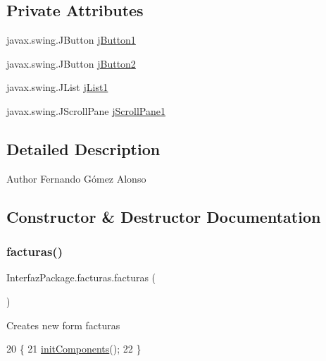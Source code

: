 \subsection*{Private Attributes}
\begin{DoxyCompactItemize}
\item 
javax.\+swing.\+J\+Button \mbox{\hyperlink{class_interfaz_package_1_1facturas_adb32118a114d1f85a76fafb76589f8c6}{j\+Button1}}
\item 
javax.\+swing.\+J\+Button \mbox{\hyperlink{class_interfaz_package_1_1facturas_acf837914fb3ffc261c9cdb1174c6d9bc}{j\+Button2}}
\item 
javax.\+swing.\+J\+List \mbox{\hyperlink{class_interfaz_package_1_1facturas_adbdef786d8dff4c1b59ff2a1308ed6c5}{j\+List1}}
\item 
javax.\+swing.\+J\+Scroll\+Pane \mbox{\hyperlink{class_interfaz_package_1_1facturas_aaf7b2113c167e17f0be9bea690595685}{j\+Scroll\+Pane1}}
\end{DoxyCompactItemize}


\subsection{Detailed Description}
\begin{DoxyAuthor}{Author}
Fernando Gómez Alonso 
\end{DoxyAuthor}


\subsection{Constructor \& Destructor Documentation}
\mbox{\label{class_interfaz_package_1_1facturas_a14c886b63fc2b58e9f9b6697daa99c6b}} 
\subsubsection{\texorpdfstring{facturas()}{facturas()}}
{\footnotesize\ttfamily Interfaz\+Package.\+facturas.\+facturas (\begin{DoxyParamCaption}{ }\end{DoxyParamCaption})\hspace{0.3cm}{\ttfamily [inline]}}

Creates new form facturas 
\begin{DoxyCode}
20                       \{
21         \mbox{\hyperlink{class_interfaz_package_1_1facturas_a9c7ac9a8c60637f510ef1918af149600}{initComponents}}();
22     \}
\end{DoxyCode}


